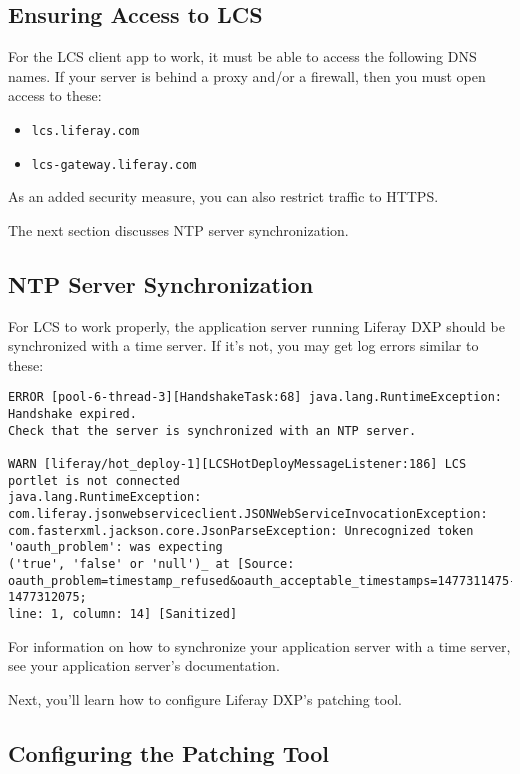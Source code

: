 \subsection{Ensuring Access to LCS}\label{ensuring-access-to-lcs}

For the LCS client app to work, it must be able to access the following
DNS names. If your server is behind a proxy and/or a firewall, then you
must open access to these:

\begin{itemize}
\tightlist
\item
  \texttt{lcs.liferay.com}
\item
  \texttt{lcs-gateway.liferay.com}
\end{itemize}

As an added security measure, you can also restrict traffic to HTTPS.

The next section discusses NTP server synchronization.

\subsection{NTP Server
Synchronization}\label{ntp-server-synchronization}

For LCS to work properly, the application server running Liferay DXP
should be synchronized with a time server. If it's not, you may get log
errors similar to these:

\begin{verbatim}
ERROR [pool-6-thread-3][HandshakeTask:68] java.lang.RuntimeException: Handshake expired.
Check that the server is synchronized with an NTP server.

WARN [liferay/hot_deploy-1][LCSHotDeployMessageListener:186] LCS portlet is not connected
java.lang.RuntimeException: com.liferay.jsonwebserviceclient.JSONWebServiceInvocationException:
com.fasterxml.jackson.core.JsonParseException: Unrecognized token 'oauth_problem': was expecting
('true', 'false' or 'null')_ at [Source: oauth_problem=timestamp_refused&oauth_acceptable_timestamps=1477311475-1477312075;
line: 1, column: 14] [Sanitized]
\end{verbatim}

For information on how to synchronize your application server with a
time server, see your application server's documentation.

Next, you'll learn how to configure Liferay DXP's patching tool.

\subsection{Configuring the Patching
Tool}\label{configuring-the-patching-tool-1}

